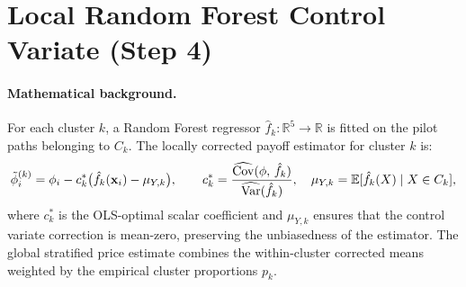 \section{Local Random Forest Control Variate (Step 4)}
\label{app:code-rf}

\paragraph{Mathematical background.}
For each cluster $k$, a Random Forest regressor
$\hat{f}_k : \mathbb{R}^5 \to \mathbb{R}$ is fitted on the
pilot paths belonging to $C_k$.  The locally corrected payoff
estimator for cluster $k$ is:
\[
  \tilde{\phi}_i^{(k)}
  = \phi_i - c_k^*\bigl(\hat{f}_k(\mathbf{x}_i) - \mu_{Y,k}\bigr),
  \qquad
  c_k^* = \frac{\widehat{\operatorname{Cov}}(\phi,\,\hat{f}_k)}
               {\widehat{\operatorname{Var}}(\hat{f}_k)},
  \quad
  \mu_{Y,k} = \mathbb{E}[\hat{f}_k(X) \mid X \in C_k],
\]
where $c_k^*$ is the OLS-optimal scalar coefficient and
$\mu_{Y,k}$ ensures that the control variate correction is
mean-zero, preserving the unbiasedness of the estimator.  The
global stratified price estimate combines the within-cluster
corrected means weighted by the empirical cluster proportions $p_k$.

